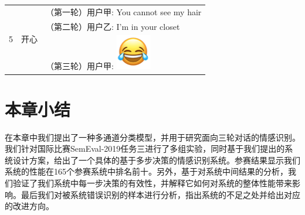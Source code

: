 \begin{table}[]
\begin{minipage}[t]{0.7\linewidth}
\begin{tabularx}{\linewidth}{c|c|l}
  \hline
  \multirow{3}{*}{5} & \multirow{3}{*}{开心} 
    &   （第一轮）用户甲: You cannot see my hair \\
    & & （第二轮）用户乙: I'm in your closet \\
    & & （第三轮）用户甲: \includegraphics[height=1.5\fontcharht\font`\B]{img/emoji/lol.png} \\
  \bottomrule[1.5pt]
  \end{tabularx}
  \end{minipage}
\end{table}

\section{本章小结}

在本章中我们提出了一种多通道分类模型，并用于研究面向三轮对话的情感识别。我们针对国际比赛SemEval-2019任务三进行了多组实验，同时基于我们提出的系统设计方案，给出了一个具体的基于多步决策的情感识别系统。参赛结果显示我们系统的性能在165个参赛系统中排名前十。另外，基于对系统中间结果的分析，我们验证了我们系统中每一步决策的有效性，并解释它如何对系统的整体性能带来影响。最后我们对被系统错误识别的样本进行分析，指出系统的不足之处并给出对应的改进方向。
